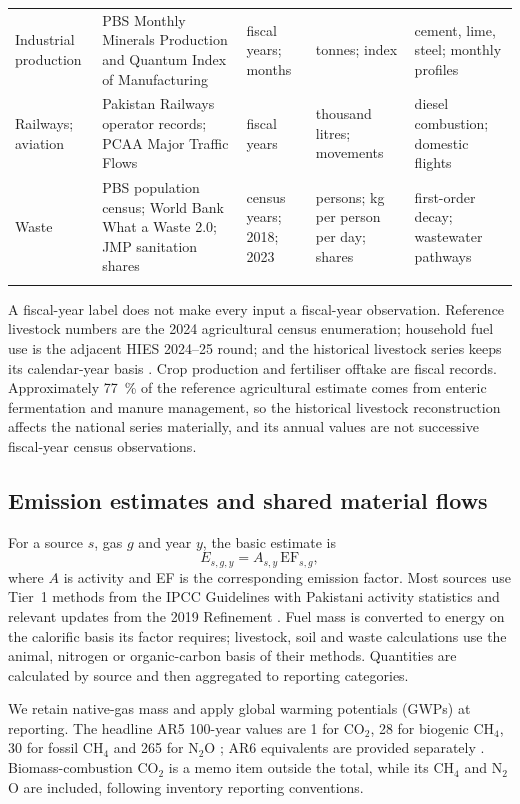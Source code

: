 \documentclass[essd,manuscript]{copernicus}
\begin{document}
\begin{table}[t]
\begin{tabular}{@{}>{\raggedright\arraybackslash}p{3.1cm}>{\raggedright\arraybackslash}p{4.3cm}>{\raggedright\arraybackslash}p{2.6cm}>{\raggedright\arraybackslash}p{2.6cm}>{\raggedright\arraybackslash}p{3.6cm}@{}}
Industrial production & PBS Monthly Minerals Production and Quantum Index of Manufacturing & fiscal years; months & tonnes; index & cement, lime, steel; monthly profiles \\
Railways; aviation & Pakistan Railways operator records; PCAA Major Traffic Flows & fiscal years & thousand litres; movements & diesel combustion; domestic flights \\
Waste & PBS population census; World Bank What a Waste 2.0; JMP sanitation shares & census years; 2018; 2023 & persons; kg per person per day; shares & first-order decay; wastewater pathways \\
\bottomhline
\end{tabular}
\end{table}

A fiscal-year label does not make every input a fiscal-year observation. Reference livestock numbers are the 2024 agricultural census enumeration; household fuel use is the adjacent HIES 2024--25 round; and the historical livestock series keeps its calendar-year basis \citep{PBSAgri2026,PBSHIES2026}. Crop production and fertiliser offtake are fiscal records. Approximately \SI{77}{\percent} of the reference agricultural estimate comes from enteric fermentation and manure management, so the historical livestock reconstruction affects the national series materially, and its annual values are not successive fiscal-year census observations.

\subsection{Emission estimates and shared material flows}
\label{sec:estimation}

For a source $s$, gas $g$ and year $y$, the basic estimate is
\begin{equation}
 E_{s,g,y}=A_{s,y}\,\mathrm{EF}_{s,g},
 \label{eq:annual}
\end{equation}
where $A$ is activity and EF is the corresponding emission factor. Most sources use Tier~1 methods from the IPCC Guidelines with Pakistani activity statistics and relevant updates from the 2019 Refinement \citep{IPCC2006,IPCC2019}. Fuel mass is converted to energy on the calorific basis its factor requires; livestock, soil and waste calculations use the animal, nitrogen or organic-carbon basis of their methods. Quantities are calculated by source and then aggregated to reporting categories.

We retain native-gas mass and apply global warming potentials (GWPs) at reporting. The headline AR5 100-year values are 1 for CO$_2$, 28 for biogenic CH$_4$, 30 for fossil CH$_4$ and 265 for N$_2$O \citep{IPCCAR5}; AR6 equivalents are provided separately \citep{IPCCAR6}. Biomass-combustion CO$_2$ is a memo item outside the total, while its CH$_4$ and N$_2$O are included, following inventory reporting conventions.
\end{document}
